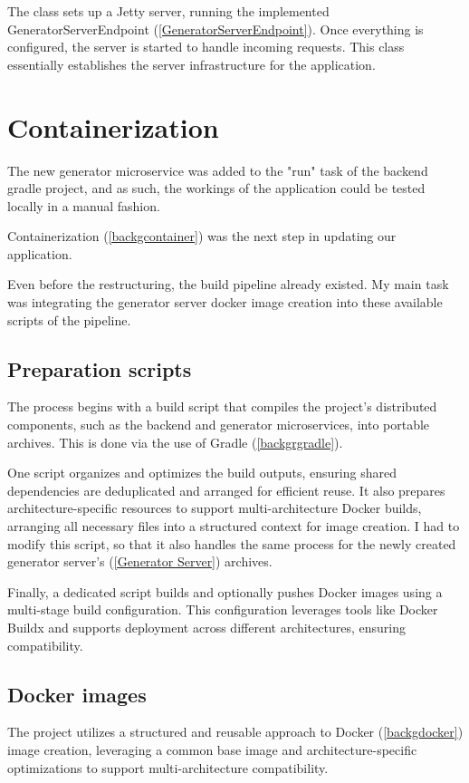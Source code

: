 		The class sets up a Jetty server, running the implemented GeneratorServerEndpoint (\ref{GeneratorServerEndpoint}).
		Once everything is configured, the server is started to handle incoming requests. 
		This class essentially establishes the server infrastructure for the application.

	\section{Containerization}\label{Containerization}
		The new generator microservice was added 
		to the "run" task of the backend gradle project, and as such, the workings of the application could be tested locally in a manual fashion. 
		
		Containerization (\ref{backgcontainer}) was the next step in 
		updating our application. 

		Even before the restructuring, the build pipeline already existed. My main task was integrating the generator server docker image creation
		into these available scripts of the pipeline. 

		\subsection{Preparation scripts}\label{Preparation scripts}
			The process begins with a build script that compiles the project's distributed components, such as the backend and generator microservices, into portable archives. 
			This is done via the use of Gradle (\ref{backgrgradle}).

			One script organizes and optimizes the build outputs, ensuring shared dependencies are deduplicated and arranged for efficient reuse. 
			It also prepares architecture-specific resources to support multi-architecture Docker builds, arranging all necessary files into a structured context for image creation.
			I had to modify this script, so that it also handles the same process for the newly created generator server's (\ref{Generator Server}) archives.

			Finally, a dedicated script builds and optionally pushes Docker images using a multi-stage build configuration. 
			This configuration leverages tools like Docker Buildx and supports deployment across different architectures, ensuring compatibility. 

		\subsection{Docker images}\label{Docker images}
			The project utilizes a structured and reusable approach to Docker (\ref{backgdocker}) image creation, leveraging a common base image and architecture-specific 
			optimizations to support multi-architecture compatibility.

